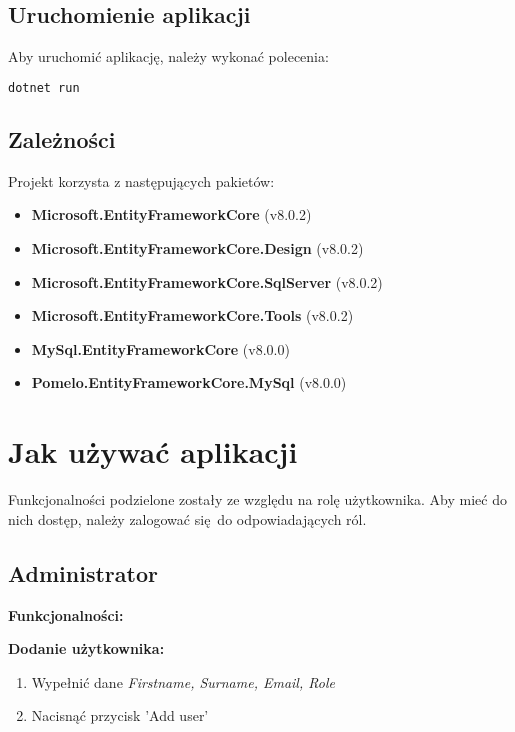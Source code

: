 \documentclass{article}
\begin{document}
\subsection{Uruchomienie aplikacji}
Aby uruchomić aplikację, należy wykonać polecenia:
\begin{lstlisting}[language=bash] 
    dotnet run
\end{lstlisting}

\vspace{1em}

\subsection{Zależności}
Projekt korzysta z następujących pakietów:

\begin{itemize}
    \item \textbf{Microsoft.EntityFrameworkCore} (v8.0.2)
    \item \textbf{Microsoft.EntityFrameworkCore.Design} (v8.0.2)
    \item \textbf{Microsoft.EntityFrameworkCore.SqlServer} (v8.0.2)
    \item \textbf{Microsoft.EntityFrameworkCore.Tools} (v8.0.2)
    \item \textbf{MySql.EntityFrameworkCore} (v8.0.0)
    \item \textbf{Pomelo.EntityFrameworkCore.MySql} (v8.0.0)
\end{itemize}

\section{Jak używać aplikacji}

Funkcjonalności podzielone zostały ze względu na rolę użytkownika. Aby mieć do nich dostęp, należy zalogować się do odpowiadających ról.

\subsection{Administrator}
\vspace{1em}

\textbf{Funkcjonalności:}
\vspace{1em}

\textbf{Dodanie użytkownika:}

\begin{enumerate}
    \item Wypełnić dane \textit{Firstname, Surname, Email, Role}
    \item Nacisnąć przycisk 'Add user'
\end{enumerate}
\end{document}
